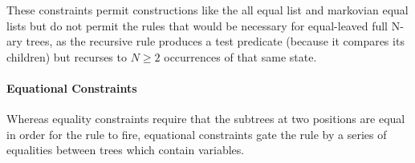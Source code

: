 These constraints permit constructions like the all equal list and markovian
equal lists but do not permit the rules that would be necessary for
equal-leaved full N-ary trees, as the recursive rule produces a test
predicate (because it compares its children) but recurses to $N \ge 2$
occurrences of that same state.

\paragraph{Equational Constraints}  Whereas equality constraints require
that the subtrees at two positions are equal in order for the rule to fire,
equational constraints gate the rule by a series of equalities between trees
which contain variables.
